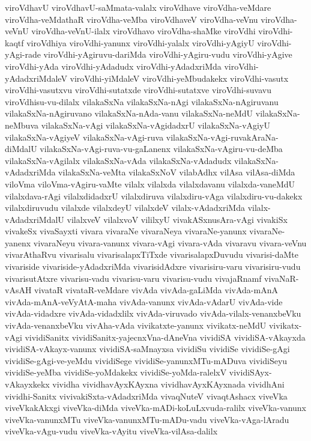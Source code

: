 {viroVdhavU
viroVdhavU-saMmata-valalx
viroVdhave
viroVdha-veMdare
viroVdha-veMdathaR
viroVdha-veMba
viroVdhaveV
viroVdha-veVnu
viroVdha-veVnU
viroVdha-veVnU-ilalx
viroVdhavo
viroVdha-shaMke
viroVdhi
viroVdhi-kaqtf
viroVdhiya
viroVdhi-yanunx
viroVdhi-yalalx
viroVdhi-yAgiyU
viroVdhi-yAgi-rade
viroVdhi-yAgiruvu-dariMda
viroVdhi-yAgiru-vudu
viroVdhi-yAgive
viroVdhi-yAda
viroVdhi-yAdadudx
viroVdhi-yAdadxriMda
viroVdhi-yAdadxriMdaleV
viroVdhi-yiMdaleV
viroVdhi-yeMbudakekx
viroVdhi-vasutx
viroVdhi-vasutxvu
viroVdhi-sutatxde
viroVdhi-sutatxve
viroVdhi-suvavu
viroVdhisu-vu-dilalx
vilakaSxNa
vilakaSxNa-nAgi
vilakaSxNa-nAgiruvanu
vilakaSxNa-nAgiruvano
vilakaSxNa-nAda-vanu
vilakaSxNa-neMdU
vilakaSxNa-neMbuva
vilakaSxNa-vAgi
vilakaSxNa-vAgidadxrU
vilakaSxNa-vAgiyU
vilakaSxNa-vAgiyeV
vilakaSxNa-vAgi-ruva
vilakaSxNa-vAgi-ruvakAraNa-diMdalU
vilakaSxNa-vAgi-ruva-vu-gaLanenx
vilakaSxNa-vAgiru-vu-deMba
vilakaSxNa-vAgilalx
vilakaSxNa-vAda
vilakaSxNa-vAdadudx
vilakaSxNa-vAdadxriMda
vilakaSxNa-veMta
vilakaSxNoV
vilabAdhx
vilAsa
vilAsa-diMda
viloVma
viloVma-vAgiru-vaMte
vilalx
vilalxda
vilalxdavanu
vilalxda-vaneMdU
vilalxdava-rAgi
vilalxdidadxrU
vilalxdiruva
vilalxdiru-vAga
vilalxdiru-vu-dakekx
vilalxdiruvudu
vilalxde
vilalxdeyU
vilalxdeV
vilalx-vAdadxriMda
vilalx-vAdadxriMdalU
vilalxveV
vilalxvoV
vililxyU
vivakASxnusAra-vAgi
vivakiSx
vivakeSx
vivaSayxti
vivara
vivaraNe
vivaraNeya
vivaraNe-yanunx
vivaraNe-yanenx
vivaraNeyu
vivara-vanunx
vivara-vAgi
vivara-vAda
vivaravu
vivara-veVnu
vivarAthaRvu
vivarisalu
vivarisalapxTiTxde
vivarisalapxDuvudu
vivarisi-daMte
vivariside
vivariside-yAdadxriMda
vivarisidAdxre
vivarisiru-varu
vivarisiru-vudu
vivarisutAtxre
vivarisu-vadu
vivarisu-varu
vivarisu-vudu
vivajaRnamf
vivaNaR-vAsAH
vivataR
vivataR-veMdare
vivAda
vivAda-gaLiMda
vivAda-mAnA
vivAda-mAnA-veVyAtA-maha
vivAda-vanunx
vivAda-vAdarU
vivAda-vide
vivAda-vidadxre
vivAda-vidadxlilx
vivAda-viruvado
vivAda-vilalx-venanxbeVku
vivAda-venanxbeVku
vivAha-vAda
vivikatxte-yanunx
vivikatx-neMdU
vivikatx-vAgi
vividiSanitx
vividiSanitx-yajecnxVna-dAneVna
vividiSA
vividiSA-vAkayxda
vividiSA-vAkayx-vanunx
vividiSA-saMnayxsa
vividiSu
vividiSe
vividiSe-gAgi
vividiSe-gAgi-ve-yeMdu
vividiSege
vividiSe-yanunxMTu-mADuva
vividiSeyu
vividiSe-yeMba
vividiSe-yoMdakekx
vividiSe-yoMda-ralelxV
vividiSAyx-vAkayxkekx
vividha
vividhavAyxKAyxna
vividhavAyxKAyxnada
vividhAni
vividhi-Sanitx
vivivakiSxta-vAdadxriMda
vivaqNuteV
vivaqtAshacx
viveVka
viveVkakAkxgi
viveVka-diMda
viveVka-mADi-koLuLxvuda-ralilx
viveVka-vanunx
viveVka-vanunxMTu
viveVka-vanunxMTu-mADu-vadu
viveVka-vAga-lAradu
viveVka-vAgu-vudu
viveVka-vAyitu
viveVka-vilAsa-dalilx
}
